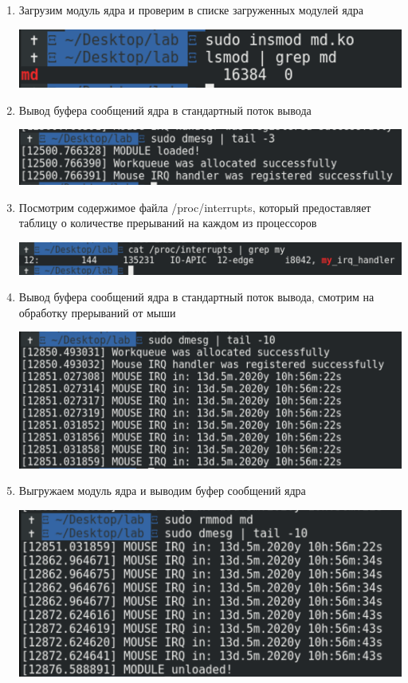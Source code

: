 \documentclass[a4paper,14pt]{extreport} %
\begin{document}
\begin{enumerate}
\item Загрузим модуль ядра и проверим в списке загруженных модулей ядра

\includegraphics[scale=0.8]{6}

\item Вывод буфера сообщений ядра в стандартный поток вывода

\includegraphics[scale=0.8]{7}

\item Посмотрим содержимое файла /proc/interrupts, который предоставляет таблицу о количестве прерываний на каждом из процессоров

\includegraphics[scale=0.5]{8}

\item Вывод буфера сообщений ядра в стандартный поток вывода, смотрим на обработку прерываний от мыши

\includegraphics[scale=0.8]{9}

\item Выгружаем модуль ядра и выводим буфер сообщений ядра

\includegraphics[scale=0.8]{10}

\end{enumerate}
\end{document}
